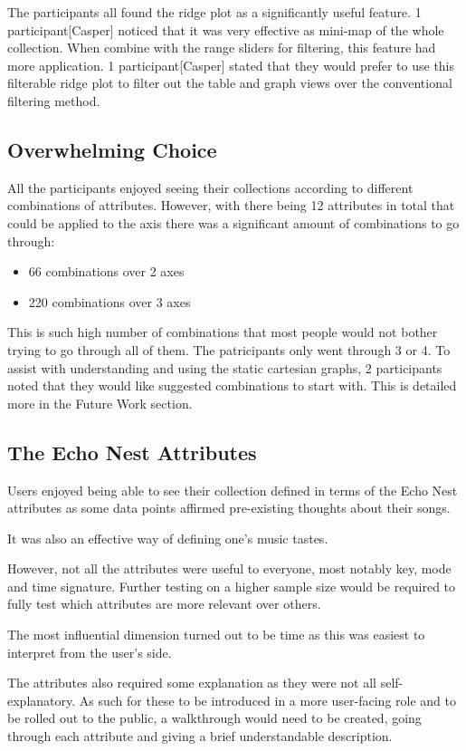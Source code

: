 The participants all found the ridge plot as a significantly useful feature. 1 participant[Casper] noticed that it was very effective as mini-map of the whole collection. When combine with the range sliders for filtering, this feature had more application. 1 participant[Casper] stated that they would prefer to use this filterable ridge plot to filter out the table and graph views over the conventional filtering method.

\subsection{Overwhelming Choice}
All the participants enjoyed seeing their collections according to different combinations of attributes. However, with there being 12 attributes in total that could be applied to the axis there was a significant amount of combinations to go through:\begin{itemize}
    \item 66 combinations over 2 axes
    \item 220 combinations over 3 axes
\end{itemize}
This is such high number of combinations that most people would not bother trying to go through all of them. The patricipants only went through 3 or 4. To assist with understanding and using the static cartesian graphs, 2 participants noted that they would like suggested combinations to start with. This is detailed more in the Future Work section.

\subsection{The Echo Nest Attributes}%
Users enjoyed being able to see their collection defined in terms of the Echo Nest attributes as some data points affirmed pre-existing thoughts about their songs.

It was also an effective way of defining one's music tastes.

However, not all the attributes were useful to everyone, most notably key, mode and time signature. Further testing on a higher sample size would be required to fully test which attributes are more relevant over others.

The most influential dimension turned out to be time as this was easiest to interpret from the user's side.

The attributes also required some explanation as they were not all self-explanatory. As such for these to be introduced in a more user-facing role and to be rolled out to the public, a walkthrough would need to be created, going through each attribute and giving a brief understandable description.

